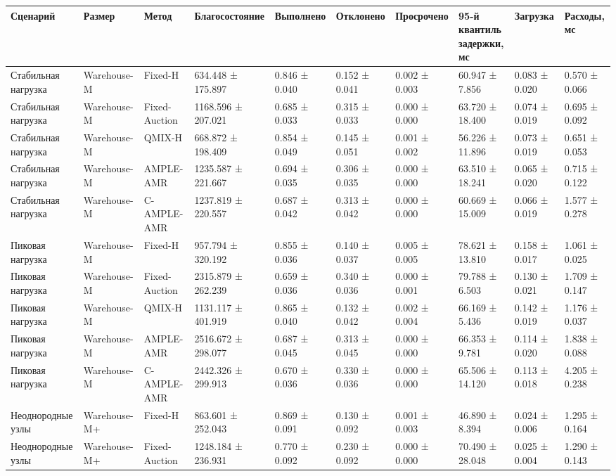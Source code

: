 \begin{tabular}{llllllllll}
\toprule
 Сценарий & Размер & Метод & Благосостояние & Выполнено & Отклонено & Просрочено & \shortstack{95-й квантиль\\задержки, мс} & Загрузка & Расходы, мс \\
\midrule
 Стабильная нагрузка & Warehouse-M & Fixed-H & 634.448 ± 175.897 & 0.846 ± 0.040 & 0.152 ± 0.041 & 0.002 ± 0.003 & 60.947 ± 7.856 & 0.083 ± 0.020 & 0.570 ± 0.066 \\
 Стабильная нагрузка & Warehouse-M & Fixed-Auction & 1168.596 ± 207.021 & 0.685 ± 0.033 & 0.315 ± 0.033 & 0.000 ± 0.000 & 63.720 ± 18.400 & 0.074 ± 0.019 & 0.695 ± 0.092 \\
 Стабильная нагрузка & Warehouse-M & QMIX-H & 668.872 ± 198.409 & 0.854 ± 0.049 & 0.145 ± 0.051 & 0.001 ± 0.002 & 56.226 ± 11.896 & 0.073 ± 0.019 & 0.651 ± 0.053 \\
 Стабильная нагрузка & Warehouse-M & AMPLE-AMR & 1235.587 ± 221.667 & 0.694 ± 0.035 & 0.306 ± 0.035 & 0.000 ± 0.000 & 63.510 ± 18.241 & 0.065 ± 0.020 & 0.715 ± 0.122 \\
 Стабильная нагрузка & Warehouse-M & C-AMPLE-AMR & 1237.819 ± 220.557 & 0.687 ± 0.042 & 0.313 ± 0.042 & 0.000 ± 0.000 & 60.669 ± 15.009 & 0.066 ± 0.019 & 1.577 ± 0.278 \\
 Пиковая нагрузка & Warehouse-M & Fixed-H & 957.794 ± 320.192 & 0.855 ± 0.036 & 0.140 ± 0.037 & 0.005 ± 0.005 & 78.621 ± 13.810 & 0.158 ± 0.017 & 1.061 ± 0.025 \\
 Пиковая нагрузка & Warehouse-M & Fixed-Auction & 2315.879 ± 262.239 & 0.659 ± 0.036 & 0.340 ± 0.036 & 0.000 ± 0.001 & 79.788 ± 6.503 & 0.130 ± 0.021 & 1.709 ± 0.147 \\
 Пиковая нагрузка & Warehouse-M & QMIX-H & 1131.117 ± 401.919 & 0.865 ± 0.040 & 0.132 ± 0.042 & 0.002 ± 0.004 & 66.169 ± 5.436 & 0.142 ± 0.019 & 1.176 ± 0.037 \\
 Пиковая нагрузка & Warehouse-M & AMPLE-AMR & 2516.672 ± 298.077 & 0.687 ± 0.045 & 0.313 ± 0.045 & 0.000 ± 0.000 & 66.353 ± 9.781 & 0.114 ± 0.020 & 1.838 ± 0.088 \\
 Пиковая нагрузка & Warehouse-M & C-AMPLE-AMR & 2442.326 ± 299.913 & 0.670 ± 0.036 & 0.330 ± 0.036 & 0.000 ± 0.000 & 65.506 ± 14.120 & 0.113 ± 0.018 & 4.205 ± 0.238 \\
 Неоднородные узлы & Warehouse-M+ & Fixed-H & 863.601 ± 252.043 & 0.869 ± 0.091 & 0.130 ± 0.092 & 0.001 ± 0.003 & 46.890 ± 8.394 & 0.024 ± 0.006 & 1.295 ± 0.164 \\
 Неоднородные узлы & Warehouse-M+ & Fixed-Auction & 1248.184 ± 236.931 & 0.770 ± 0.092 & 0.230 ± 0.092 & 0.000 ± 0.000 & 70.490 ± 28.048 & 0.025 ± 0.004 & 1.290 ± 0.143 \\

\end{tabular}

